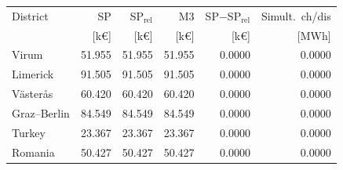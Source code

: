 \begin{tabular}{lrrrrr}
\toprule
District & SP & SP$_{\mathrm{rel}}$ & M3 & SP$-$SP$_{\mathrm{rel}}$ & Simult.\ ch/dis \\
 & [k\euro] & [k\euro] & [k\euro] & [k\euro] & [MWh] \\
\midrule
Virum & 51.955 & 51.955 & 51.955 & 0.0000 & 0.0000 \\
Limerick & 91.505 & 91.505 & 91.505 & 0.0000 & 0.0000 \\
V\"aster\aa s & 60.420 & 60.420 & 60.420 & 0.0000 & 0.0000 \\
Graz--Berlin & 84.549 & 84.549 & 84.549 & 0.0000 & 0.0000 \\
Turkey & 23.367 & 23.367 & 23.367 & 0.0000 & 0.0000 \\
Romania & 50.427 & 50.427 & 50.427 & 0.0000 & 0.0000 \\
\bottomrule
\end{tabular}
